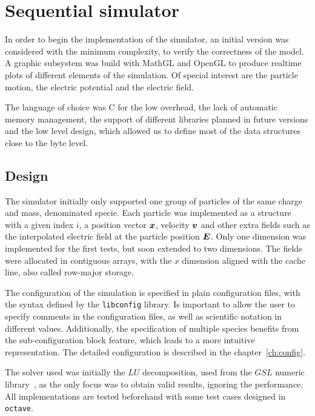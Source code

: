 \chapter{Sequential simulator}
\label{ch:sequential}

In order to begin the implementation of the simulator, an initial version was
considered with the minimum complexity, to verify the correctness of the model.
A graphic subsystem was build with MathGL and OpenGL to produce realtime plots
of different elements of the simulation. Of special interest are the particle
motion, the electric potential and the electric field.

The language of choice was C for the low overhead, the lack of automatic memory
management, the support of different libraries planned in future versions and
the low level design, which allowed us to define most of the data structures
close to the byte level.

\section{Design}

The simulator initially only supported one group of particles of the same charge
and mass, denominated specie. Each particle was implemented as a structure with
a given index $i$, a position vector $\bm{x}$, velocity $\bm{v}$ and other extra fields
such as the interpolated electric field at the particle position $\bm{E}$.
%
Only one dimension was implemented for the first tests, but soon extended to two 
dimensions.  The fields were allocated in contiguous arrays, with the $x$ 
dimension aligned with the cache line, also called row-major storage.

The configuration of the simulation is specified in plain configuration files,
with the syntax defined by the \texttt{libconfig} library. Is important to allow
the user to specify comments in the configuration files, as well as scientific
notation in different values. Additionally, the specification of multiple species
benefits from the sub-configuration block feature, which leads to a more
intuitive representation. The detailed configuration is described in the
chapter~\ref{ch:config}.

The solver used was initially the $LU$ decomposition, used from the $GSL$
numeric library~\cite{gsl}, as the only focus was to obtain valid results, ignoring the
performance. All implementations are tested beforehand with some test cases
designed in \texttt{octave}.

